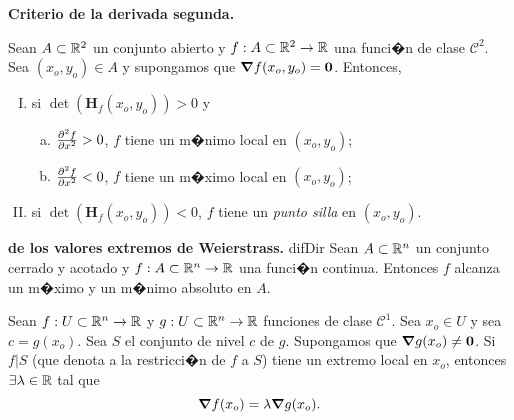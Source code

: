 \documentclass[a4paper]{scrartcl} %
\begin{document}
\begin{theorem}\textbf{Criterio de la derivada segunda.} \label{teo:derivada_2da}
\mbox{}

 Sean $A \subset \mathbb{R}^2$ un conjunto abierto y $f: A \subset \mathbb{R}^2 \to \mathbb{R}$ una funci�n de clase $\mathcal{C}^2$. Sea $(x_o,y_o) \in A$ y supongamos que $\grad f(x_o,y_o) = \mathbf{0}$. Entonces,  
 \begin{enumerate} [I.]
    \item si $\det(\mathbf{H}_f (x_o,y_o)) > 0$ y
    \begin{enumerate}[(a)]
        \item $\pdv[2]{f}{x} (x_o,y_o) > 0$, $f$ tiene un m�nimo local en $(x_o,y_o)$;
        \item $\pdv[2]{f}{x} (x_o,y_o) < 0$, $f$ tiene un m�ximo local en $(x_o,y_o)$;
    \end{enumerate}
    \item si $\det(\mathbf{H}_f (x_o,y_o)) < 0$, $f$ tiene un \emph{punto silla} en $(x_o,y_o)$.
 \end{enumerate}

\end{theorem}

\begin{theorem}\textbf{de los valores extremos de Weierstrass.} \label{teo:weier}difDir
  Sean $A \subset \mathbb{R}^n$ un conjunto cerrado y acotado y $f: A \subset \mathbb{R}^n \to \mathbb{R}$ una funci�n continua. Entonces $f$ alcanza un m�ximo y un m�nimo absoluto en $A$.
\end{theorem}

\begin{theorem}  \label{teo:lagrange}
    Sean $f:U \subset \mathbb{R}^n \to \mathbb{R}$ y $g:U \subset \mathbb{R}^n \to \mathbb{R}$ funciones de clase $\mathcal{C}^1$. Sea $x_o \in U$ y sea $c = g(x_o)$. Sea $S$ el conjunto de nivel $c$ de $g$. Supongamos que $\grad g (x_o) \ne \mathbf{0}$. Si $f|S$ (que denota a la restricci�n de $f$ a $S$) tiene un extremo local en $x_o$, entonces $\exists \lambda \in \mathbb{R}$ tal que
    \[
     \grad f (x_o) = \lambda \grad g (x_o).
    \]
\end{theorem}






% 
% 
\end{document}
